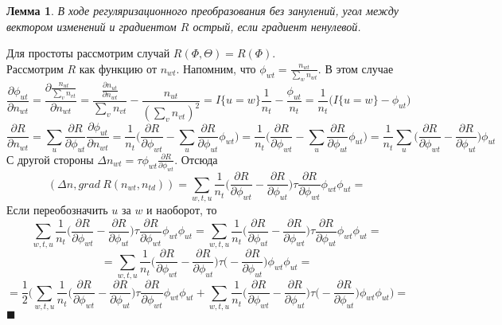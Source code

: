 \documentclass[12pt]{article}
\newtheorem{lemma}[remark]{Лемма}
\newenvironment{Proof} 
	{\par\noindent{\bf Доказательство.}} 
	{\hfill$\blacksquare$}
\begin{document}
\begin{lemma}           
 В ходе регуляризационного преобразования  без занулений, угол  между вектором изменений и градиентом $R$ острый, если градиент ненулевой.
\end{lemma}
\begin{Proof}
Для простоты рассмотрим случай $R(\Phi, \Theta) = R(\Phi)$.\\
Рассмотрим $R$ как функцию от $n_{wt}$.  Напомним, что  $\phi_{wt} = \frac{n_{wt}}{\sum\limits_w n_{wt}}$. В этом случае 
\[
\frac{\partial{\phi_{ut}}}{\partial{n_{wt}}} = \frac{\partial{ \frac{n_{ut}}{\sum\limits_v n_{vt}}}}{\partial{n_{wt}}} = \frac{ \frac{\partial{n_{ut}}}{\partial{n_{wt}}}}{\sum\limits_v n_{vt}} - \frac{n_{ut}}{(\sum\limits_v n_{vt})^2} = I\{u = w\} \frac{1}{n_t} - \frac{\phi_{ut}}{n_t} = \frac{1}{n_t}\bigg( 
 I\{u = w\} - \phi_{ut} \bigg)
\]
\[
\frac{\partial{R}}{\partial{n_{wt}}} = \sum_{u} \frac{\partial{R}}{\partial{\phi_{ut}}} \frac{\partial{\phi_{ut}}}{\partial{n_{wt}}} = \frac{1}{n_t} \bigg( \frac{\partial{R}}{\partial{\phi_{wt}}} - \sum_{u}  \frac{\partial{R}}{\partial{\phi_{ut}}} \phi_{wt} \bigg) = \frac{1}{n_t} \bigg( \frac{\partial{R}}{\partial{\phi_{wt}}} - \sum_{u}  \frac{\partial{R}}{\partial{\phi_{ut}}} \phi_{ut} \bigg) = \frac{1}{n_t} \sum_{u} \bigg(\frac{\partial{R}}{\partial{\phi_{wt}}}  -  \frac{\partial{R}}{\partial{\phi_{ut}}} \bigg)  \phi_{ut}
\]
С другой стороны $\Delta n_{wt} = \tau \phi_{wt} \frac{\partial{R}}{\partial{\phi_{wt}}}$. Отсюда
\[
(\Delta n, grad\ R(n_{wt}, n_{td})) = \sum\limits_{w, t, u}  \frac{1}{n_{t}}  \bigg(  \frac{\partial{R}}{\partial{\phi_{wt}}}  -  \frac{\partial{R}}{\partial{\phi_{ut}}}  \bigg)  \tau \frac{\partial{R}}{\partial{\phi_{wt}}} \phi_{wt} \phi_{ut}  = 
\]
Если переобозначить $u$ за $w$ и наоборот, то 
\[
\sum\limits_{w, t, u}  \frac{1}{n_{t}}  \bigg(  \frac{\partial{R}}{\partial{\phi_{wt}}}  -  \frac{\partial{R}}{\partial{\phi_{ut}}}  \bigg)  \tau \frac{\partial{R}}{\partial{\phi_{wt}}} \phi_{wt} \phi_{ut}  = \sum\limits_{w, t, u}  \frac{1}{n_{t}}  \bigg(  \frac{\partial{R}}{\partial{\phi_{ut}}}  -  \frac{\partial{R}}{\partial{\phi_{wt}}}  \bigg)  \tau \frac{\partial{R}}{\partial{\phi_{ut}}} \phi_{wt} \phi_{ut} = 
\]
\[
= \sum\limits_{w, t, u}  \frac{1}{n_{t}}  \bigg(  \frac{\partial{R}}{\partial{\phi_{wt}}}  -  \frac{\partial{R}}{\partial{\phi_{ut}}}  \bigg)  \tau \big(-\frac{\partial{R}}{\partial{\phi_{ut}}}\big) \phi_{wt} \phi_{ut} = 
\]
\[
= \frac12 \bigg(\sum\limits_{w, t, u}  \frac{1}{n_{t}}  \bigg(  \frac{\partial{R}}{\partial{\phi_{wt}}}  -  \frac{\partial{R}}{\partial{\phi_{ut}}}  \bigg)  \tau \frac{\partial{R}}{\partial{\phi_{wt}}} \phi_{wt} \phi_{ut} +  \sum\limits_{w, t, u}  \frac{1}{n_{t}}  \bigg(  \frac{\partial{R}}{\partial{\phi_{wt}}}  -  \frac{\partial{R}}{\partial{\phi_{ut}}}  \bigg)  \tau \big(-\frac{\partial{R}}{\partial{\phi_{ut}}}\big) \phi_{wt} \phi_{ut} \bigg)= 
\]
\end{Proof}
\end{document}
